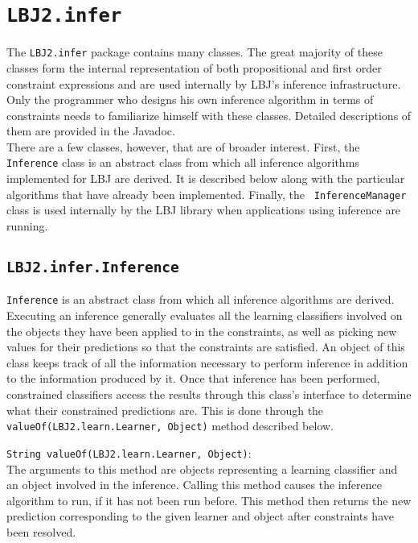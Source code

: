 \section{{\tt LBJ2.infer}}

The {\tt LBJ2.infer} package contains many classes.  The great majority of
these classes form the internal representation of both propositional and first
order constraint expressions and are used internally by LBJ's inference
infrastructure.  Only the programmer who designs his own inference algorithm
in terms of constraints needs to familiarize himself with these classes.
Detailed descriptions of them are provided in the Javadoc. \\

There are a few classes, however, that are of broader interest.  First, the
{\tt Inference} class is an abstract class from which all inference algorithms
implemented for LBJ are derived.  It is described below along with the
particular algorithms that have already been implemented.  Finally, the {\tt
InferenceManager} class is used internally by the LBJ library when
applications using inference are running.

\subsection{{\tt LBJ2.infer.Inference}}

{\tt Inference} is an abstract class from which all inference algorithms are
derived.  Executing an inference generally evaluates all the learning
classifiers involved on the objects they have been applied to in the
constraints, as well as picking new values for their predictions so that the
constraints are satisfied.  An object of this class keeps track of all the
information necessary to perform inference in addition to the information
produced by it.  Once that inference has been performed, constrained
classifiers access the results through this class's interface to determine
what their constrained predictions are.  This is done through the {\tt
valueOf(LBJ2.learn.Learner, Object)} method described below.

\begin{list}{}{}
\item[{\tt String valueOf(LBJ2.learn.Learner, Object)}:] ~\\
The arguments to this method are objects representing a learning classifier
and an object involved in the inference.  Calling this method causes the
inference algorithm to run, if it has not been run before.  This method then
returns the new prediction corresponding to the given learner and object after
constraints have been resolved.
\end{list}

